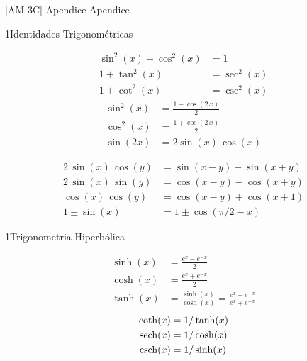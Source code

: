 \documentclass["AM3C-Slides_annotations.tex"]{subfiles}
\begin{document}

[AM 3C]
{Apendice} %
{Apendice} %

\begin{sectionBox}1{Identidades Trigonométricas} %
  \begin{multicols}{2}
    \begin{align}
        \sin^2(x) + \cos^2(x) &= 1
      \\ 1 + \tan^2(x)         &= \sec^2(x)
      \\ 1 + \cot^2(x)         &= \csc^2(x)
    \end{align}
    \begin{align}
         \sin^2(x)             &= \frac{1-\cos(2\,x)}{2}
      \\ \cos^2(x)             &= \frac{1+\cos(2\,x)}{2}
      \\ \sin(2x)              &= 2 \sin(x)\,\cos(x)
    \end{align}
  \end{multicols}
  \begin{align}
       2\,\sin(x)\,\cos(y)   &= \sin(x - y) + \sin(x + y)
    \\ 2\,\sin(x)\,\sin(y)   &= \cos(x - y) - \cos(x + y)
    \\ \cos(x)\,\cos(y)      &= \cos(x - y) + \cos(x + 1)
    \\ 1 \pm \sin(x)           &= 1 \pm \cos(\pi/2 - x)
  \end{align}
\end{sectionBox}

\begin{sectionBox}1{Trigonometria Hiperbólica} %
  \begin{multicols}{2}
    \begin{align}
         \sinh(x) &= \frac{e^{x}-e^{-x}}{2}
      \\ \cosh(x) &= \frac{e^{x}+e^{-x}}{2}
      \\ \tanh(x) &= \frac{\sinh(x)}{\cosh(x)}=\frac{e^{x}-e^{-x}}{e^{x}+e^{-x}}
    \end{align}
    \begin{align}
         \coth(x) &= 1/\tanh(x)
      \\ \operatorname{sech}(x) &= 1/\cosh(x)
      \\ \operatorname{csch}(x) &= 1/\sinh(x)
    \end{align}
  \end{multicols}
\end{sectionBox}
\end{document}
